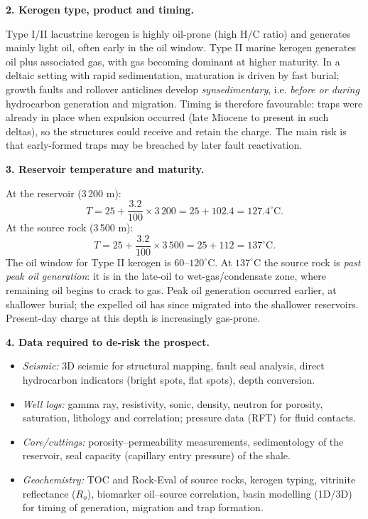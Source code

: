 \documentclass[11pt]{article}
\begin{document}
\begin{corrige}
\textbf{2. Kerogen type, product and timing.}\par
Type I/II lacustrine kerogen is highly oil-prone (high H/C ratio) and generates mainly light oil, often early in the oil window. Type II marine kerogen generates oil plus associated gas, with gas becoming dominant at higher maturity. In a deltaic setting with rapid sedimentation, maturation is driven by fast burial; growth faults and rollover anticlines develop \emph{synsedimentary}, i.e. \emph{before or during} hydrocarbon generation and migration. Timing is therefore favourable: traps were already in place when expulsion occurred (late Miocene to present in such deltas), so the structures could receive and retain the charge. The main risk is that early-formed traps may be breached by later fault reactivation.

\textbf{3. Reservoir temperature and maturity.}\par
At the reservoir (3\,200 m):
\[
T = 25 + \frac{3.2}{100}\times 3\,200 = 25 + 102.4 = 127.4^\circ\mathrm{C}.
\]
At the source rock (3\,500 m):
\[
T = 25 + \frac{3.2}{100}\times 3\,500 = 25 + 112 = 137^\circ\mathrm{C}.
\]
The oil window for Type II kerogen is $60$--$120^\circ$C. At $137^\circ$C the source rock is \emph{past peak oil generation}: it is in the late-oil to wet-gas/condensate zone, where remaining oil begins to crack to gas. Peak oil generation occurred earlier, at shallower burial; the expelled oil has since migrated into the shallower reservoirs. Present-day charge at this depth is increasingly gas-prone.

\textbf{4. Data required to de-risk the prospect.}\par
\begin{itemize}
\item \emph{Seismic:} 3D seismic for structural mapping, fault seal analysis, direct hydrocarbon indicators (bright spots, flat spots), depth conversion.
\item \emph{Well logs:} gamma ray, resistivity, sonic, density, neutron for porosity, saturation, lithology and correlation; pressure data (RFT) for fluid contacts.
\item \emph{Core/cuttings:} porosity--permeability measurements, sedimentology of the reservoir, seal capacity (capillary entry pressure) of the shale.
\item \emph{Geochemistry:} TOC and Rock-Eval of source rocks, kerogen typing, vitrinite reflectance ($R_o$), biomarker oil--source correlation, basin modelling (1D/3D) for timing of generation, migration and trap formation.
\end{itemize}
\end{corrige}
\end{document}
